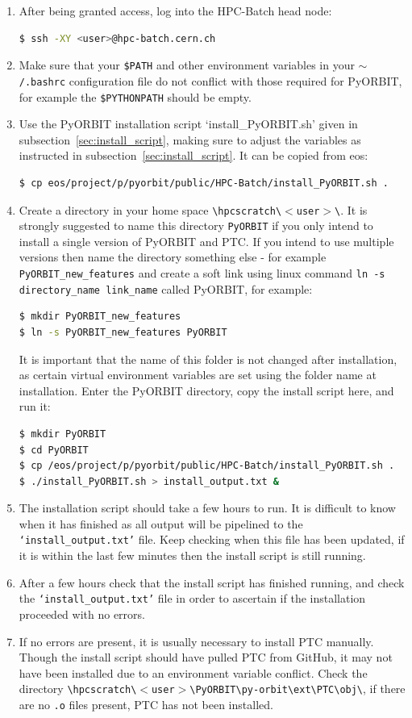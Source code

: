 \documentclass[a4paper]{cernatsnote}
\def \batchroot {\texttt{\textbackslash hpcscratch\textbackslash $<$user$>$\textbackslash}}
\def \batchorbitptc {\texttt{\textbackslash hpcscratch\textbackslash $<$user$>$\textbackslash PyORBIT\textbackslash py-orbit\textbackslash ext\textbackslash PTC\textbackslash}}
\begin{document}
\begin{enumerate}
\item After being granted access, log into the HPC-Batch head node:
\begin{lstlisting}[language=bash, belowskip=-3\medskipamount]
$ ssh -XY <user>@hpc-batch.cern.ch
\end{lstlisting}
\item Make sure that your \texttt{\$PATH} and other environment variables in your \texttt{$\sim$/.bashrc} configuration file do not conflict with those required for PyORBIT, for example the \texttt{\$PYTHONPATH} should be empty.
\item Use the PyORBIT installation script `install\_PyORBIT.sh' given in subsection~\ref{sec:install_script}, making sure to adjust the variables as instructed in subsection~\ref{sec:install_script}. It can be copied from eos:
\begin{lstlisting}[language=bash, belowskip=-3\medskipamount]
$ cp eos/project/p/pyorbit/public/HPC-Batch/install_PyORBIT.sh .
\end{lstlisting}		
\item Create a directory in your home space \batchroot. It is strongly suggested to name this directory \texttt{PyORBIT} if you only intend to install a single version of PyORBIT and PTC. If you intend to use multiple versions then name the directory something else - for example \texttt{PyORBIT\_new\_features} and create a soft link using linux command \texttt{ln -s directory\_name link\_name} called PyORBIT, for example: 
\begin{lstlisting}[language=bash, belowskip=-3\medskipamount]
$ mkdir PyORBIT_new_features
$ ln -s PyORBIT_new_features PyORBIT
\end{lstlisting}
It is important that the name of this folder is not changed after installation, as certain virtual environment variables are set using the folder name at installation. Enter the PyORBIT directory, copy the install script here, and run it:
\begin{lstlisting}[language=bash, belowskip=-3\medskipamount]
$ mkdir PyORBIT
$ cd PyORBIT
$ cp /eos/project/p/pyorbit/public/HPC-Batch/install_PyORBIT.sh .
$ ./install_PyORBIT.sh > install_output.txt &
\end{lstlisting}
\item The installation script should take a few hours to run. It is difficult to know when it has finished as all output will be pipelined to the \texttt{`install\_output.txt'} file. Keep checking when this file has been updated, if it is within the last few minutes then the install script is still running.
\item After a few hours check that the install script has finished running, and check the \texttt{`install\_output.txt'} file in order to ascertain if the installation proceeded with no errors.
\item If no errors are present, it is usually necessary to install PTC manually. Though the install script should have pulled PTC from GitHub, it may not have been installed due to an environment variable conflict. Check the directory \batchorbitptc \texttt{obj\textbackslash}, if there are no \texttt{.o} files present, PTC has not been installed.


\end{enumerate}
\end{document}
